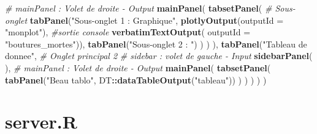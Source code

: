 \documentclass[]{report}
\newenvironment{Shaded}{\begin{snugshade}}{\end{snugshade}}
\newcommand{\KeywordTok}[1]{\textcolor[rgb]{0.13,0.29,0.53}{\textbf{#1}}}
\newcommand{\DataTypeTok}[1]{\textcolor[rgb]{0.13,0.29,0.53}{#1}}
\newcommand{\StringTok}[1]{\textcolor[rgb]{0.31,0.60,0.02}{#1}}
\newcommand{\CommentTok}[1]{\textcolor[rgb]{0.56,0.35,0.01}{\textit{#1}}}
\newcommand{\OperatorTok}[1]{\textcolor[rgb]{0.81,0.36,0.00}{\textbf{#1}}}
\newcommand{\NormalTok}[1]{#1}
\begin{document}
\begin{Shaded}
\begin{Highlighting}[]
             \CommentTok{# mainPanel : Volet de droite - Output}
             \KeywordTok{mainPanel}\NormalTok{(}
               \KeywordTok{tabsetPanel}\NormalTok{( }\CommentTok{# Sous-onglet}
                 \KeywordTok{tabPanel}\NormalTok{(}\StringTok{"Sous-onglet 1 : Graphique"}\NormalTok{,}
                          \KeywordTok{plotlyOutput}\NormalTok{(}\DataTypeTok{outputId =} \StringTok{"monplot"}\NormalTok{),}
                          \CommentTok{#sortie console}
                          \KeywordTok{verbatimTextOutput}\NormalTok{(}
                            \DataTypeTok{outputId =} \StringTok{"boutures_mortes"}\NormalTok{)),}
                 \KeywordTok{tabPanel}\NormalTok{(}\StringTok{"Sous-onglet 2 : "}\NormalTok{)}
\NormalTok{               )}
\NormalTok{             )}
\NormalTok{    ),}
    \KeywordTok{tabPanel}\NormalTok{(}\StringTok{"Tableau de donnee"}\NormalTok{, }\CommentTok{# Onglet principal 2}
             \CommentTok{# sidebar : volet de gauche - Input}
             \KeywordTok{sidebarPanel}\NormalTok{(}
\NormalTok{             ),}
             \CommentTok{# mainPanel : Volet de droite - Output}
             \KeywordTok{mainPanel}\NormalTok{(}
               \KeywordTok{tabsetPanel}\NormalTok{(}
                 \KeywordTok{tabPanel}\NormalTok{(}\StringTok{"Beau tablo"}\NormalTok{, DT}\OperatorTok{::}\KeywordTok{dataTableOutput}\NormalTok{(}\StringTok{"tableau"}\NormalTok{))}
\NormalTok{               )}
\NormalTok{             )}
\NormalTok{    )}
\NormalTok{  )}
\NormalTok{)}
\end{Highlighting}
\end{Shaded}

\section{server.R}\label{server.r}
\end{document}
